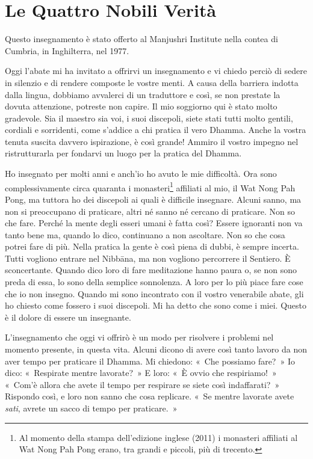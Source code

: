 \chapter{Le Quattro Nobili Verità}

\begin{openingQuote}
  \centering

  Questo insegnamento è stato offerto al Manjushri Institute nella contea di
  Cumbria, in Inghilterra, nel 1977.
\end{openingQuote}

Oggi l'abate mi ha invitato a offrirvi un insegnamento e vi chiedo
perciò di sedere in silenzio e di rendere composte le vostre menti. A
causa della barriera indotta dalla lingua, dobbiamo avvalerci di un
traduttore e così, se non prestate la dovuta attenzione, potreste non
capire. Il mio soggiorno qui è stato molto gradevole. Sia il maestro sia
voi, i suoi discepoli, siete stati tutti molto gentili, cordiali e
sorridenti, come s'addice a chi pratica il vero Dhamma. Anche la vostra
tenuta suscita davvero ispirazione, è così grande! Ammiro il vostro
impegno nel ristrutturarla per fondarvi un luogo per la pratica del
Dhamma.

Ho insegnato per molti anni e anch'io ho avuto le mie difficoltà. Ora
sono complessivamente circa quaranta i monasteri\footnote{Al momento
  della stampa dell'edizione inglese (2011) i monasteri affiliati al Wat
  Nong Pah Pong erano, tra grandi e piccoli, più di trecento.} affiliati
al mio, il Wat Nong Pah Pong, ma tuttora ho dei discepoli ai quali è
difficile insegnare. Alcuni sanno, ma non si preoccupano di praticare,
altri né sanno né cercano di praticare. Non so che fare. Perché la mente
degli esseri umani è fatta così? Essere ignoranti non va tanto bene ma,
quando lo dico, continuano a non ascoltare. Non so che cosa potrei fare
di più. Nella pratica la gente è così piena di dubbi, è sempre incerta.
Tutti vogliono entrare nel Nibbāna, ma non vogliono percorrere il
Sentiero. È sconcertante. Quando dico loro di fare meditazione hanno
paura o, se non sono preda di essa, lo sono della semplice sonnolenza. A
loro per lo più piace fare cose che io non insegno. Quando mi sono
incontrato con il vostro venerabile abate, gli ho chiesto come fossero i
suoi discepoli. Mi ha detto che sono come i miei. Questo è il dolore di
essere un insegnante.

L'insegnamento che oggi vi offrirò è un modo per risolvere i problemi
nel momento presente, in questa vita. Alcuni dicono di avere così tanto
lavoro da non aver tempo per praticare il Dhamma. Mi chiedono: «~Che
possiamo fare?~» Io dico: «~Respirate mentre lavorate?~» E loro: «~È
ovvio che respiriamo!~» «~Com'è allora che avete il tempo per respirare
se siete così indaffarati?~» Rispondo così, e loro non sanno che cosa
replicare. «~Se mentre lavorate avete \emph{sati}, avrete un sacco di
tempo per praticare.~»

